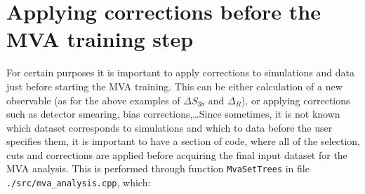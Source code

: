 \documentclass[12pt,a4paper]{report}
\begin{document}
\section{Applying corrections before the MVA training step} \label{ch:corrections}
For certain purposes it is important to apply corrections to simulations and data just before starting the MVA training. This can be either calculation of a new observable (as for the above examples of $\Delta S_{38}$ and $\Delta_R$), or applying corrections such as detector smearing, bias corrections,\dots Since sometimes, it is not known which dataset corresponds to simulations and which to data before the user specifies them, it is important to have a section of code, where all of the selection, cuts and corrections are applied before acquiring the final input dataset for the MVA analysis. This is performed through function \texttt{MvaSetTrees} in file \texttt{./src/mva\_analysis.cpp}, which:
\end{document}
